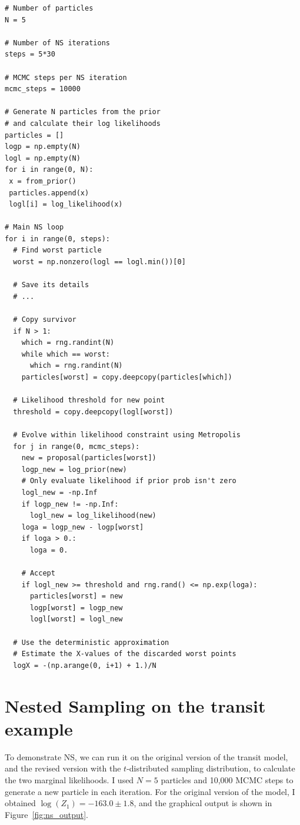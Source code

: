 \begin{verbatim}
# Number of particles
N = 5

# Number of NS iterations
steps = 5*30

# MCMC steps per NS iteration
mcmc_steps = 10000

# Generate N particles from the prior
# and calculate their log likelihoods
particles = []
logp = np.empty(N)
logl = np.empty(N)
for i in range(0, N):
 x = from_prior()
 particles.append(x)
 logl[i] = log_likelihood(x)

# Main NS loop
for i in range(0, steps):
  # Find worst particle
  worst = np.nonzero(logl == logl.min())[0]

  # Save its details
  # ...

  # Copy survivor
  if N > 1:
    which = rng.randint(N)
    while which == worst:
      which = rng.randint(N)
    particles[worst] = copy.deepcopy(particles[which])

  # Likelihood threshold for new point
  threshold = copy.deepcopy(logl[worst])

  # Evolve within likelihood constraint using Metropolis
  for j in range(0, mcmc_steps):
    new = proposal(particles[worst])
    logp_new = log_prior(new)
    # Only evaluate likelihood if prior prob isn't zero
    logl_new = -np.Inf
    if logp_new != -np.Inf:
      logl_new = log_likelihood(new)
    loga = logp_new - logp[worst]
    if loga > 0.:
      loga = 0.

    # Accept
    if logl_new >= threshold and rng.rand() <= np.exp(loga):
      particles[worst] = new
      logp[worst] = logp_new
      logl[worst] = logl_new

  # Use the deterministic approximation
  # Estimate the X-values of the discarded worst points
  logX = -(np.arange(0, i+1) + 1.)/N
\end{verbatim}

\section{Nested Sampling on the transit example}\label{sec:model_selection}
To demonstrate NS, we can run it on the original version of the transit model,
and the revised version with the $t$-distributed sampling distribution, to
calculate the two marginal likelihoods. I used $N=5$ particles and 10,000
MCMC steps to generate a new particle in each iteration.
For the original version of the model, I obtained
$\log(Z_1) = -163.0 \pm 1.8$, and the graphical output is shown in
Figure~\ref{fig:ns_output}.

